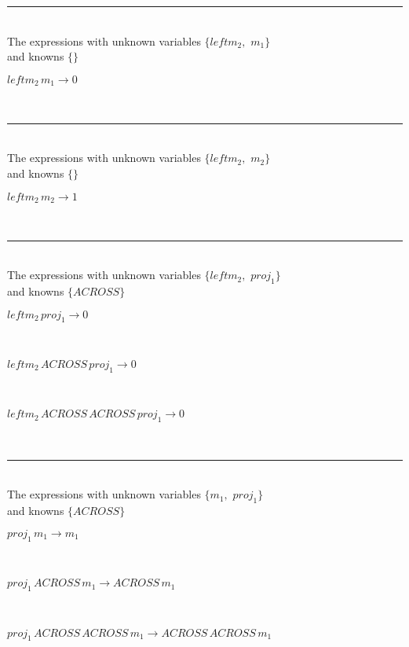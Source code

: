 \rule[3pt]{6in}{.7pt}\\
The expressions with unknown variables $\{leftm_{2},
$ $
m_{1}\}$\\
and knowns $\{\}$\smallskip\\
\begin{minipage}{6in}
$
leftm_{2}\,
 m_{1}\rightarrow 0
$
\end{minipage}\\
\rule[3pt]{6in}{.7pt}\\
The expressions with unknown variables $\{leftm_{2},
$ $
m_{2}\}$\\
and knowns $\{\}$\smallskip\\
\begin{minipage}{6in}
$
leftm_{2}\,
 m_{2}\rightarrow 1
$
\end{minipage}\\
\rule[3pt]{6in}{.7pt}\\
The expressions with unknown variables $\{leftm_{2},
$ $
proj_{1}\}$\\
and knowns $\{ACROSS\}$\smallskip\\
\begin{minipage}{6in}
$
leftm_{2}\,
 proj_{1}\rightarrow 0
$
\end{minipage}\medskip \\
\begin{minipage}{6in}
$
leftm_{2}\,
 ACROSS\,
 proj_{1}\rightarrow 0
$
\end{minipage}\medskip \\
\begin{minipage}{6in}
$
leftm_{2}\,
 ACROSS\,
 ACROSS\,
 proj_{1}\rightarrow 0
$
\end{minipage}\\
\rule[3pt]{6in}{.7pt}\\
The expressions with unknown variables $\{m_{1},
$ $
proj_{1}\}$\\
and knowns $\{ACROSS\}$\smallskip\\
\begin{minipage}{6in}
$
proj_{1}\,
 m_{1}\rightarrow m_{1}
$
\end{minipage}\medskip \\
\begin{minipage}{6in}
$
proj_{1}\,
 ACROSS\,
 m_{1}\rightarrow ACROSS\,
 m_{1}
$
\end{minipage}\medskip \\
\begin{minipage}{6in}
$
proj_{1}\,
 ACROSS\,
 ACROSS\,
 m_{1}\rightarrow ACROSS\,
 ACROSS\,
 m_{1}
$
\end{minipage}\\
